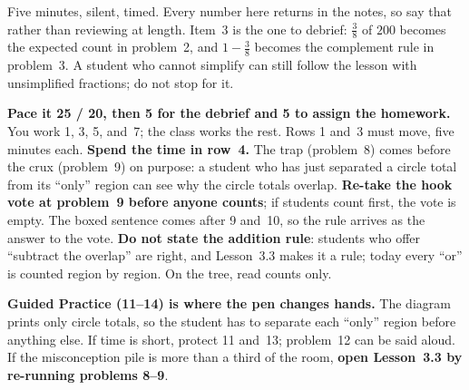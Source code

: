 \documentclass[10pt]{article}
\begin{document}
\begin{teachernote}[Warm-Up]
Five minutes, silent, timed. Every number here returns in the notes, so say that rather than
reviewing at length. Item~3 is the one to debrief: $\frac38$ of $200$ becomes the expected count
in problem~2, and $1 - \frac38$ becomes the complement rule in problem~3. A student who cannot
simplify can still follow the lesson with unsimplified fractions; do not stop for it.
\end{teachernote}

\begin{teachernote}
\textbf{Pace it 25 / 20, then 5 for the debrief and 5 to assign the homework.} You work 1, 3, 5,
and~7; the class works the rest. Rows 1 and~3 must move, five minutes each.
\textbf{Spend the time in row~4.} The trap (problem~8) comes before the crux (problem~9) on
purpose: a student who has just separated a circle total from its ``only'' region can see why the
circle totals overlap. \textbf{Re-take the hook vote at problem~9 before anyone counts}; if
students count first, the vote is empty. The boxed sentence comes after 9 and~10, so the rule
arrives as the answer to the vote. \textbf{Do not state the addition rule}: students who offer
``subtract the overlap'' are right, and Lesson~3.3 makes it a rule; today every ``or'' is counted
region by region. On the tree, read counts only.

\textbf{Guided Practice (11--14) is where the pen changes hands.} The diagram prints only circle
totals, so the student has to separate each ``only'' region before anything else. If time is short,
protect 11 and~13; problem~12 can be said aloud. If the misconception pile is more than a third of
the room, \textbf{open Lesson~3.3 by re-running problems 8--9}.
\end{teachernote}
\end{document}
